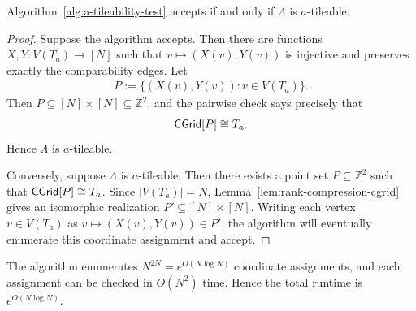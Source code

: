 \begin{theorem}
\label{thm:finite-a-tileability-test}
Algorithm~\ref{alg:a-tileability-test} accepts if and only if
\(\Lambda\) is \(a\)-tileable.
\end{theorem}

\begin{proof}
Suppose the algorithm accepts. Then there are functions
\(X,Y:V(T_a)\to[N]\) such that \(v\mapsto (X(v),Y(v))\) is injective and
preserves exactly the comparability edges. Let
\begin{align}
    P:=\{(X(v),Y(v)):v\in V(T_a)\}.
\end{align}
Then \(P\subseteq [N]\times[N]\subseteq \mathbb Z^2\), and the pairwise check
says precisely that
\begin{align}
    \mathsf{CGrid}[P]\cong T_a.
\end{align}
Hence \(\Lambda\) is \(a\)-tileable.

Conversely, suppose \(\Lambda\) is \(a\)-tileable. Then there exists a point
set \(P\subseteq\mathbb Z^2\) such that \(\mathsf{CGrid}[P]\cong T_a\). Since
\(|V(T_a)|=N\), Lemma~\ref{lem:rank-compression-cgrid} gives an isomorphic
realization \(P'\subseteq[N]\times[N]\). Writing each vertex \(v\in V(T_a)\)
as \(v\mapsto (X(v),Y(v))\in P'\), the algorithm will eventually enumerate
this coordinate assignment and accept.
\end{proof}

The algorithm enumerates \(N^{2N}=e^{O(N\log N)}\) coordinate assignments,
and each assignment can be checked in \(O(N^2)\) time. Hence the total runtime is
\(e^{O(N\log N)}\).